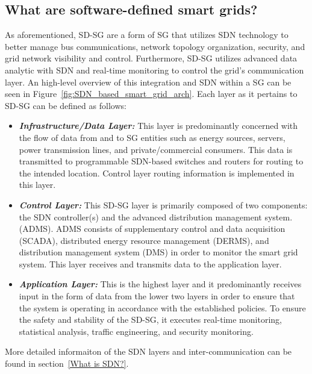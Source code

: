 \documentclass[conference]{IEEEtran}
\begin{document}
\subsection{What are software-defined smart grids?}
\label{What are software defined smart grids?}
As aforementioned, SD-SG are a form of SG that utilizes SDN technology to better manage bus communications, network topology organization, security, and grid network visibility and control. Furthermore, SD-SG utilizes advanced data analytic with SDN and real-time monitoring to control the grid's communication layer. An high-level overview of this integration and SDN within a SG can be seen in Figure~\ref{fig:SDN_based_smart_grid_arch}. Each layer as it pertains to SD-SG can be defined as follows:
\begin{itemize}
    \item \textbf{\emph{Infrastructure/Data Layer:}} This layer is predominantly concerned with the flow of data from and to SG entities such as energy sources, servers, power transmission lines, and private/commercial consumers. This data is transmitted to programmable SDN-based switches and routers for routing to the intended location. Control layer routing information is implemented in this layer.
    \item \textbf{\emph{Control Layer:}} This SD-SG layer is primarily composed of two components: the SDN controller(s) and the advanced distribution management system. (ADMS). ADMS consists of supplementary control and data acquisition (SCADA), distributed energy resource management (DERMS), and distribution management system (DMS) in order to monitor the smart grid system. This layer receives and transmits data to the application layer.
    \item \textbf{\emph{Application Layer:}} This is the highest layer and it predominantly receives input in the form of data from the lower two layers in order to ensure that the system is operating in accordance with the established policies. To ensure the safety and stability of the SD-SG, it executes real-time monitoring, statistical analysis, traffic engineering, and security monitoring. 
\end{itemize}
More detailed informaiton of the SDN layers and inter-communication can be found in section~\ref{What is SDN?}. %
\end{document}
